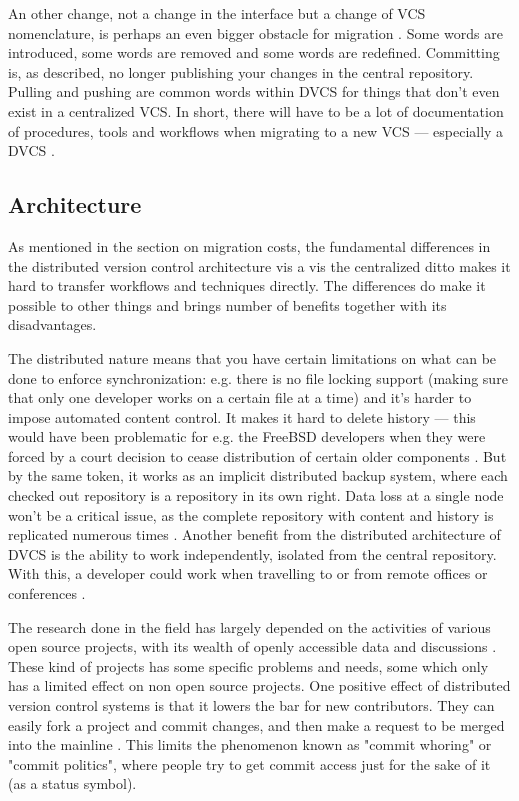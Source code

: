 \documentclass{llncs}
\begin{document}
An other change, not a change in the interface but a change of VCS
nomenclature, is perhaps an even bigger obstacle for migration
\cite{bird09}. Some words are introduced, some words are removed and
some words are redefined. Committing is, as described, no longer
publishing your changes in the central repository. Pulling and pushing
are common words within DVCS for things that don't even exist in a
centralized VCS. In short, there will have to be a lot of
documentation of procedures, tools and workflows when migrating to a
new VCS --- especially a DVCS \cite{alwis09}.

\subsection{Architecture}

As mentioned in the section on migration costs, the fundamental
differences in the distributed version control architecture vis a vis 
the centralized ditto makes it hard to transfer workflows and
techniques directly. The differences do make it possible to other
things and brings number of benefits together with its disadvantages.

The distributed nature means that you have certain limitations on what
can be done to enforce synchronization: e.g. there is no file locking
support (making sure that only one developer works on a certain file
at a time) \cite{osullivan09} and it's harder to impose automated
content control. It makes it hard to delete history --- this would
have been problematic for e.g. the FreeBSD developers when they were
forced by a court decision to cease distribution of certain older
components \cite{alwis09}. But by the same token, it works as an
implicit distributed backup system, where each checked out repository
is a repository in its own right. Data loss at a single node won't be
a critical issue, as the complete repository with content and history
is replicated numerous times \cite{alwis09}. Another benefit from the
distributed architecture of DVCS is the ability to work independently,
isolated from the central repository. With this, a developer could
work when travelling to or from remote offices or conferences
\cite{alwis09}\cite{robert06}.

The research done in the field has largely depended on the activities
of various open source projects, with its wealth of openly accessible
data and discussions \cite{alwis09}\cite{bird09}. These kind of
projects has some specific problems and needs, some which only has a
limited effect on non open source projects. One positive effect of
distributed version control systems is that it lowers the bar for new
contributors. They can easily fork a project and commit changes, and
then make a request to be merged into the mainline \cite{alwis09}.
This limits the phenomenon known as "commit whoring" or "commit
politics", where people try to get commit access just for the sake of
it (as a status symbol).
\end{document}
